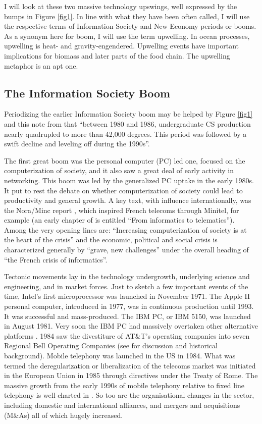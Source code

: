 \documentclass{article}
\begin{document}
I will look at these two massive technology upswings, well 
expressed by the bumps in Figure \ref{fig1}.  In line with what 
they have been often called, I will use the respective terms 
of Information Society and New Economy periods or booms.  
As a synonym here for boom, I will use the term upwelling.  
In ocean processes, upwelling is heat- and gravity-engendered.
Upwelling events have important implications for biomass and 
later parts of the food chain.  The upwelling metaphor is an apt 
one.

\subsection{The Information Society Boom}

Periodizing the earlier Information Society boom may be helped by Figure 
\ref{fig1} and this 
note from \cite{vegso}  that ``between 1980 and 1986, undergraduate CS 
production nearly quadrupled to more than 42,000 degrees. This 
period was followed 
by a swift decline and leveling off during the 1990s''.  

The first great boom was the personal computer (PC) 
led one, focused on the computerization of society, 
and it also saw a great deal of early activity in networking.
This boom was led by the generalized PC uptake in the early 1980s.  
It put to rest 
the debate on whether computerization of society could lead to 
productivity and 
general growth.  A key text, with influence internationally, was 
the Nora/Minc report \cite{nora}, which inspired 
French telecoms through Minitel, for example (an early chapter 
of \cite{nora} is 
entitled ``From informatics to 
telematics'').   Among the very opening lines are: 
``Increasing computerization of society is at the heart of the crisis''
and the economic, 
political and social crisis is characterized generally by 
``grave, new challenges''
under the overall heading of 
``the French crisis of informatics''.  

Tectonic movements lay in the technology undergrowth, 
underlying science and engineering, and in market forces. 
Just to sketch a few important events of the time,
Intel's first microprocessor was launched in November 1971.  The Apple II personal computer, introduced in 1977, was in continuous
production until 1993.   It was successful and 
mass-produced.  The IBM PC, or IBM 5150, was launched in August 1981.  
Very soon the IBM PC had massively overtaken other alternative 
platforms \cite{ibmpcshare}.  1984 saw the divestiture of AT\&T's 
operating companies into seven Regional Bell Operating Companies 
(see \cite{pennings} for discussion and historical background).
Mobile telephony was launched in the US in 1984.
What was termed the deregularization or liberalization of the 
telecoms market was initiated in the European Union in 1985 
through directives under the Treaty of Rome.  The massive growth
from the early 1990s of mobile telephony relative to fixed line telephony 
is well charted in \cite{pennings}.  So too are the organisational
changes in the sector, including domestic and international alliances,
and mergers and acquisitions (M\&As) all of which hugely increased.
\end{document}
